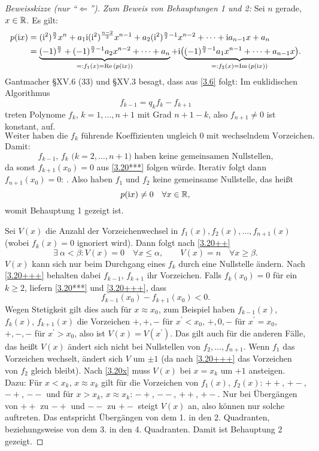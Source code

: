 \documentclass[a4paper,twoside,DIV15,BCOR12mm]{scrbook}
\begin{document}
\begin{proof}[Beweisskizze (nur "`$\Leftarrow$"')]
\textit{Zum Beweis von Behauptungen 1 und 2:} Sei $n$ gerade, $x\in\mathbb{R}$. Es gilt:
\begin{align*}
p(\mathrm{i} x) &= (\mathrm{i}^2)^{\frac{n}{2}}x^n + a_1\mathrm{i}(\mathrm{i}^2)^{\frac{n-2}{2}}x^{n-1} + a_2(\mathrm{i}^2)^{\frac{n}{2}-1}x^{n-2} + \dotsb +\mathrm{i} a_{n-1}x + a_n\\
&=\underbrace{(-1)^{\frac{n}{2}}+(-1)^{\frac{n}{2}-1}a_2x^{n-2}+\dotsb+a_n}_{=: f_1(x) = \operatorname{Re}{(p(\mathrm{i} x))}} + \mathrm{i}\bigl(\underbrace{(-1)^{\frac{n}{2}-1}a_1x^{n-1}+\dotsb+a_{n-1}x}_{=: f_2(x) = \operatorname{Im}{(p(\mathrm{i} x))}}\bigr).
\end{align*}
Gantmacher §XV.6 (33) und §XV.3 besagt, dass aus \eqref{3.6} folgt: Im euklidischen Algorithmus
\[\label{3.20***}f_{k-1} = q_kf_k-f_{k+1}\tag{$***$}\]
treten Polynome $f_k$, $k=1,\dotsc,n+1$ mit Grad $n+1-k$, also $f_{n+1}\neq 0$ ist konstant, auf. 
\[\label{3.20++}\text{Weiter haben die $f_k$ führende Koeffizienten ungleich 0 mit wechselndem Vorzeichen.}\tag{++}\]
Damit: 
\[\label{3.20+++}\text{$f_{k-1}$, $f_k$ ($k=2,\dotsc,n+1$) haben keine gemeinsamen Nullstellen,}\tag{+++}\]
da sonst $f_{k+1}(x_0) = 0$ aus \eqref{3.20***} folgen würde. Iterativ folgt dann $f_{n+1}(x_0) = 0$: \ws. Also haben $f_1$ und $f_2$ keine gemeinsame Nullstelle, das heißt
\[p(\mathrm{i} x)\neq 0\quad\forall x\in\mathbb{R},\]
womit Behauptung 1 gezeigt ist.

Sei $V(x)$ die Anzahl der Vorzeichenwechsel in $f_1(x),f_2(x),\dotsc,f_{n+1}(x)$ (wobei $f_k(x)=0$ ignoriert wird). Dann folgt nach \eqref{3.20++}
\[\label{3.20x}\exists\:\alpha<\beta: V(x) = 0\quad\forall x\leq\alpha,\qquad V(x)=n\quad\forall x\geq\beta.\tag{$\times$}\]
$V(x)$ kann sich nur beim Durchgang eines $f_k$ durch eine Nullstelle ändern. Nach \eqref{3.20+++} behalten dabei $f_{k-1}$, $f_{k+1}$ ihr Vorzeichen. Falls $f_k(x_0) = 0$ für ein $k\geq 2$, liefern \eqref{3.20***} und \eqref{3.20+++}, dass
\[f_{k-1}(x_0) - f_{k+1}(x_0) < 0.\]
Wegen Stetigkeit gilt dies auch für $x\approx x_0$, zum Beispiel haben $f_{k-1}(x)$, $f_k(x)$, $f_{k+1}(x)$ die Vorzeichen $+,+,-$ für $x^\prime<x_0$, $+,0,-$ für $x^\prime=x_0$, $+,-,-$ für $x^\prime>x_0$, also ist $V(x) = V(x^\prime)$. Das gilt auch für die anderen Fälle, das heißt $V(x)$ ändert sich nicht bei Nullstellen von $f_2,\dotsc,f_{n+1}$. Wenn $f_1$ das Vorzeichen wechselt, ändert sich $V$ um $\pm 1$ (da nach \eqref{3.20+++} das Vorzeichen von $f_2$ gleich bleibt). Nach \eqref{3.20x} muss $V(x)$ bei $x=x_k$ um $+1$ ansteigen. Dazu:  Für $x<x_k$, $x\approx x_k$ gilt für die Vorzeichen von $f_1(x)$, $f_2(x)$: $++$, $+-$, $-+$, $--$ und für $x>x_k$, $x\approx x_k$: $-+$, $--$, $++$, $+-$. Nur bei Übergängen von $++$ zu $-+$ und $--$ zu $+-$ steigt $V(x)$ an, also können nur solche auftreten. Das entspricht Übergängen von dem 1. in den 2. Quadranten, beziehungsweise von dem 3. in den 4. Quadranten. Damit ist Behauptung 2 gezeigt.
\end{proof}
\end{document}
